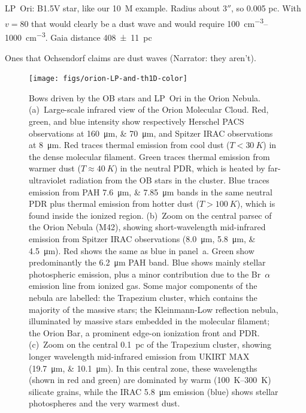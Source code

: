 LP~Ori: B1.5V star, like our \SI{10}{M_\odot} example. Radius about
\(3''\), so 0.005 pc.  With \(v = 80\) that would clearly be a dust
wave and would require \SIrange{100}{1000}{cm^{-3}}. Gaia distance \SI{408 +- 11}{pc}


Ones that Ochsendorf claims are dust waves (Narrator: they aren't).


\begin{figure}
  \centering
  \texttt{[image: figs/orion-LP-and-th1D-color]}
  \caption{Bows driven by the OB stars \thD{} and LP~Ori in the Orion
    Nebula.  (a)~Large-scale infrared view of the Orion Molecular
    Cloud.  Red, green, and blue intensity show respectively Herschel
    PACS observations at \SIlist{160; 70}{\um}, and Spitzer IRAC
    observations at \SI{8}{\um}.  Red traces thermal emission from
    cool dust (\(T < \SI{30}{K}\)) in the dense molecular filament.
    Green traces thermal emission from warmer dust
    (\(T \approx \SI{40}{K}\)) in the neutral PDR, which is heated by
    far-ultraviolet radiation from the OB stars in the cluster. Blue
    traces emission from PAH \SIlist{7.6;7.85}{\um} bands in the same
    neutral PDR plus thermal emission from hotter dust
    (\(T > \SI{100}{K}\)), which is found inside the ionized \hii{}
    region.  (b)~Zoom on the central parsec of the Orion Nebula (M42),
    showing short-wavelength mid-infrared emission from Spitzer IRAC
    observations (\SIlist{8.0;5.8;4.5}{\um}).  Red shows the same as
    blue in panel~a.  Green show predominantly the \SI{6.2}{\um} PAH
    band.  Blue shows mainly stellar photospheric emission, plus a
    minor contribution due to the Br~\(\alpha\) emission line from ionized
    gas. Some major components of the nebula are labelled: the
    Trapezium cluster, which contains the majority of the massive
    stars; the Kleinmann-Low reflection nebula, illuminated by massive
    stars embedded in the molecular filament; the Orion Bar, a
    prominent edge-on ionization front and PDR.  (c)~Zoom on the
    central \SI{0.1}{pc} of the Trapezium cluster, showing longer
    wavelength mid-infrared emission from UKIRT MAX
    (\SIlist{19.7;10.1}{\um}).  In this central zone, these
    wavelengths (shown in red and green) are dominated by warm
    (\SIrange{100}{300}{K}) silicate grains, while the IRAC
    \SI{5.8}{\um} emission (blue) shows stellar photospheres and the
    very warmest dust.}
  \label{fig:orion-bows}
\end{figure}

